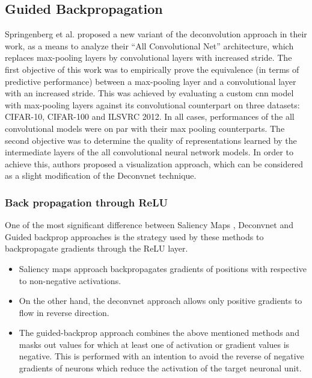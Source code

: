 \documentclass[../report.tex]{subfiles}
\begin{document}
 \subsection{Guided Backpropagation}
 Springenberg et al. proposed a new variant of the deconvolution approach in their work, as a means to analyze their \enquote{All Convolutional Net} architecture, which replaces max-pooling layers by convolutional layers with increased stride. The first objective of this work was to empirically prove the equivalence (in terms of predictive performance) between a max-pooling layer and a convolutional layer with an increased stride. This was achieved by evaluating a custom cnn model with max-pooling layers against its convolutional counterpart on three datasets: CIFAR-10, CIFAR-100 and ILSVRC 2012. In all cases, performances of the all convolutional models were on par with their max pooling counterparts. The second objective was to determine the quality of representations learned by the intermediate layers of the all convolutional neural network models. In order to achieve this, authors proposed a visualization  approach, which can be considered as a slight modification of the Deconvnet \cite{matthew2014visualizing} technique.
 \subsubsection{Back propagation through ReLU}
 One of the most significant difference between Saliency Maps \cite{simonyan2013deep}, Deconvnet \cite{matthew2014visualizing} and Guided backprop \cite{guided_backprop} approaches is the strategy used by these methods to backpropagate gradients through the ReLU layer. 
 
 \begin{itemize}
 	\item Saliency maps approach backpropagates gradients of positions with respective to non-negative activations.
 	\item On the other hand, the deconvnet approach allows only positive gradients to flow in reverse direction.
 	\item The guided-backprop approach combines the above mentioned methods and masks out values for which at least  one of activation or gradient values is negative. This is performed with an intention to avoid the reverse of negative gradients of neurons which reduce the activation of the target neuronal unit.
 \end{itemize}
\end{document}
